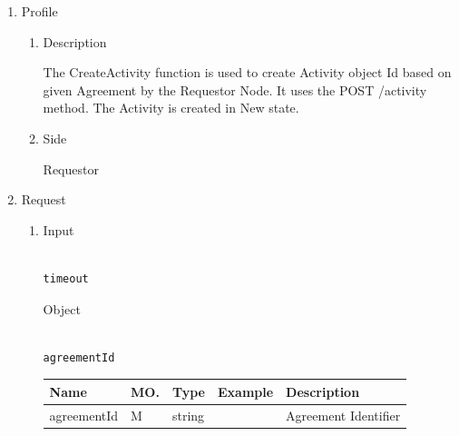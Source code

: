 
\begin{enumerate}

\item Profile

\begin{enumerate}

\item Description

The CreateActivity function is used to create Activity object Id based on given Agreement by the Requestor Node. 
It uses the POST /activity method. The Activity is created in New state.

\item Side

Requestor

\end{enumerate}

\item Request

\begin{enumerate}

\item Input

\begin{tcolorbox}[boxrule=0pt, frame empty]
\begin{verbatim}

timeout

\end{verbatim}
\end{tcolorbox}

Object

\begin{tcolorbox}[boxrule=0pt, frame empty]
\begin{verbatim}

agreementId

\end{verbatim}
\end{tcolorbox}

\begin{table}[H]
\footnotesize

\begin{center}
\begin{tabular}{|p{3cm}|l|p{3cm}|p{3cm}|p{4cm}|} 
\hline
\rowcolor{lightgray}	Name	& MO.	& Type	& Example & 	Description \\
\hline

agreementId				& M	& 	string				&								&	Agreement Identifier \\ 
\hline


\end{tabular}
\end{center}
\end{table}
\end{enumerate}
\end{enumerate}
